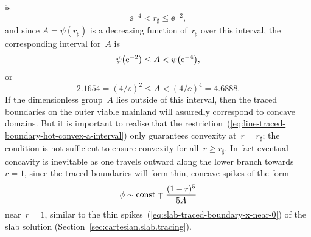 is
\begin{equation}
  \ee^{-4} < r_\sharp \le \ee^{-2},
  \label{eq:line-traced-boundary-hot-convex-r-sharp-interval}
\end{equation}
and since $A = \psi (r_\sharp)$ is a decreasing function of~$r_\sharp$
over this interval,
the corresponding interval for~$A$ is
\[
  \psi \roundbr*{\ee^{-2}} \le A < \psi \roundbr*{\ee^{-4}},
\]
or
\begin{equation}
  2.1654 = (4 / \ee)^2 \le A < (4 / \ee)^4 = 4.6888.
  \label{eq:line-traced-boundary-hot-convex-a-interval}
\end{equation}
If the dimensionless group~$A$ lies outside of this interval,
then the traced boundaries on the outer viable mainland
will assuredly correspond to concave domains.
But it is important to realise that
the restriction~(\ref{eq:line-traced-boundary-hot-convex-a-interval})
only guarantees convexity at~$r = r_\sharp$;
the condition is not sufficient to ensure convexity for all~$r \ge r_\sharp$.
In fact eventual concavity is inevitable
as one travels outward along the lower branch towards~$r = 1$,
since the traced boundaries will form thin, concave spikes of the form
\begin{equation}
  \phi \sim \mathrm{const} \mp \frac{(1 - r)^5}{5 A}
  \label{eq:line-traced-boundary-r-near-1}
\end{equation}
near~$r = 1$,
similar to the thin spikes~(\ref{eq:slab-traced-boundary-x-near-0})
of the slab solution (Section~\ref{sec:cartesian.slab.tracing}).

